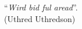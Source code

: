 \thispagestyle{empty}
\begin{center}
%
\end{center}
\vspace{21cm}

\begin{flushright}
``\emph{Wird bid ful ar{ea}d}''.  \\ (Uthred Uthredson)
\end{flushright}
